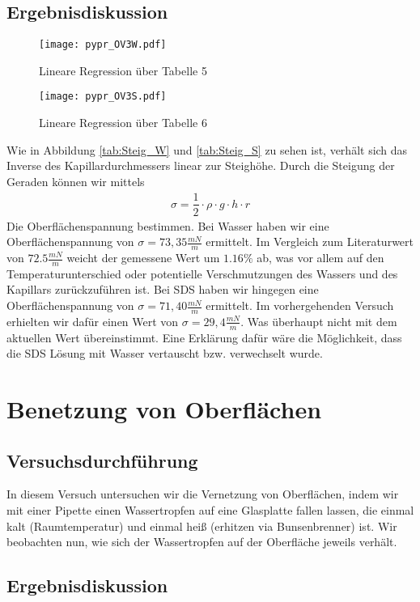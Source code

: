 \documentclass{scrartcl}
\begin{document}
\subsection{Ergebnisdiskussion}
\begin{figure}[H]
  \centering
    \texttt{[image: pypr\_OV3W.pdf]}
  \caption{Lineare Regression über Tabelle 5}
  \label{fig:Steig_W}
\end{figure}
\begin{figure}[H]
  \centering
    \texttt{[image: pypr\_OV3S.pdf]}
  \caption{Lineare Regression über Tabelle 6}
  \label{fig:Steig_S}
\end{figure}
Wie in Abbildung \ref{tab:Steig_W} und \ref{tab:Steig_S} zu sehen ist, verhält sich das Inverse des Kapillardurchmessers linear zur Steighöhe. Durch die Steigung der Geraden können wir mittels
\begin{align}
\sigma = \dfrac{1}{2}\cdot \rho \cdot g \cdot h \cdot r 
\label{eq:sigma_V3}
\end{align}
Die Oberflächenspannung bestimmen.
Bei Wasser haben wir eine Oberflächenspannung von $\sigma = 73,35 \frac{mN}{m}$ ermittelt. Im Vergleich zum Literaturwert von $72.5 \frac{mN}{m}$ weicht der gemessene Wert um $1.16\%$ ab, was vor allem auf den Temperaturunterschied oder potentielle Verschmutzungen des Wassers und des Kapillars zurückzuführen ist.
Bei SDS haben wir hingegen eine Oberflächenspannung von $\sigma = 71,40 \frac{mN}{m}$ ermittelt. Im vorhergehenden Versuch erhielten wir dafür einen Wert von $\sigma = 29,4 \frac{mN}{m}$. Was überhaupt nicht mit dem aktuellen Wert übereinstimmt.
Eine Erklärung dafür wäre die Möglichkeit, dass die SDS Lösung mit Wasser vertauscht bzw. verwechselt wurde.

\newpage
\section{Benetzung von Oberflächen}
\subsection{Versuchsdurchführung}
In diesem Versuch untersuchen wir die Vernetzung von Oberflächen, indem wir mit einer Pipette einen Wassertropfen auf eine Glasplatte fallen lassen,  die einmal kalt (Raumtemperatur) und einmal heiß (erhitzen via Bunsenbrenner) ist.
Wir beobachten nun, wie sich der Wassertropfen auf der Oberfläche jeweils verhält. 

\subsection{Ergebnisdiskussion}
\end{document}
